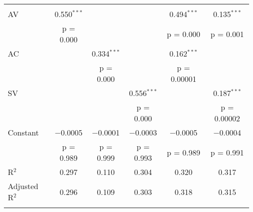
\begin{tabular}{@{\extracolsep{5pt}}lccccc} 
\\
\hline \\[-1.8ex] 
\hline \\[-1.8ex] 
 AV & 0.550$^{***}$ &  &  & 0.494$^{***}$ & 0.135$^{***}$ \\ 
  & p = 0.000 &  &  & p = 0.000 & p = 0.001 \\ 
 AC &  & 0.334$^{***}$ &  & 0.162$^{***}$ &  \\ 
  &  & p = 0.000 &  & p = 0.00001 &  \\ 
 SV &  &  & 0.556$^{***}$ &  & 0.187$^{***}$ \\ 
  &  &  & p = 0.000 &  & p = 0.00002 \\ 
 Constant & $-$0.0005 & $-$0.0001 & $-$0.0003 & $-$0.0005 & $-$0.0004 \\ 
  & p = 0.989 & p = 0.999 & p = 0.993 & p = 0.989 & p = 0.991 \\ 
R$^{2}$ & 0.297 & 0.110 & 0.304 & 0.320 & 0.317 \\ 
Adjusted R$^{2}$ & 0.296 & 0.109 & 0.303 & 0.318 & 0.315 \\ 
\hline \\[-1.8ex] 
\end{tabular} 

